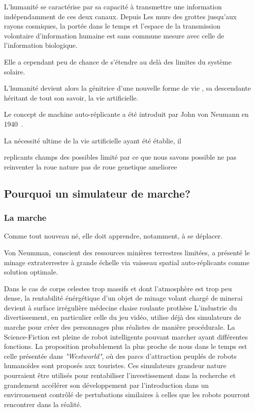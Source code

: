 \documentclass[journal, a4paper]{IEEEtran}
\begin{document}
	L'humanité se caractérise par sa capacité à transmettre une
	information indépendamment de ces deux canaux. Depuis Les murs
	des grottes jusqu'aux rayons cosmiques, la portée dans le temps et
	l'espace de la transmission volontaire d'information humaine est
	sans commune mesure avec
	celle de l'information biologique.

	Elle a cependant peu de chance de s'étendre au delà des limites du
	système solaire.

	L'humanité devient alors la génitrice d'une nouvelle forme de vie
	, sa
	descendante héritant de tout son savoir,
	la vie artificielle.

	Le concept de machine auto-réplicante a été introduit par John
	von Neumann en 1940~\cite{replicating-automata}.

	La nécessité ultime de la vie artificielle ayant été établie, il

	replicants
	champs des possibles limité par ce que nous savons possible
	ne pas reinventer la roue
	nature pas de roue
	genetique amelioree

	\subsection{Pourquoi un simulateur de marche?}
	\subsubsection{La marche}
	Comme tout nouveau né, elle doit apprendre, notamment, à se
	déplacer.

	Von Neumman, conscient des ressources minières terrestres limitées,
	a présenté le minage extraterrestre à grande échelle via vaisseau
	spatial auto-réplicants comme solution optimale.

	Dans le cas de corps
	celestes trop massifs et dont l'atmosphère est trop peu dense, la
	rentabilité énérgétique d'un objet de minage volant chargé de
	minerai
	devient à
	surface	irrégulière
	médecine chaise roulante prothèse
	L'industrie du divertissement, en particulier celle du jeu vidéo,
	utilise déjà des simulateurs de marche pour créer des personnages
	plus réalistes de manière procédurale.
	La Science-Fiction est pleine de robot intelligents pouvant
	marcher ayant différentes fonctions.
	La proposition probablement la plus proche de nous dans le
	temps est celle présentée dans \textit{"Westworld"}, où des parcs
	d'attraction peuplés de robots humanoïdes sont proposés aux
	touristes. Ces simulateurs grandeur nature pourraient être
	utilisés pour rentabiliser l'investissement dans la recherche
	et grandement accélérer son développement par l'introduction dans
	un envirronement contrôlé de
	pertubations similaires à celles que les robots pourront rencontrer
	dans
	la réalité.
\end{document}
